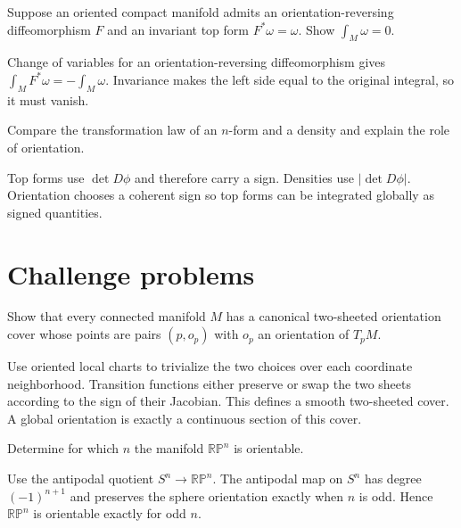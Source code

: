 \begin{problem}\label{prob:vii10-11}
Suppose an oriented compact manifold admits an orientation-reversing diffeomorphism $F$ and an invariant top form $F^*\omega=\omega$. Show $\int_M\omega=0$.
\end{problem}
\begin{solution}
Change of variables for an orientation-reversing diffeomorphism gives $\int_MF^*\omega=-\int_M\omega$. Invariance makes the left side equal to the original integral, so it must vanish.
\end{solution}

\begin{problem}\label{prob:vii10-12}
Compare the transformation law of an $n$-form and a density and explain the role of orientation.
\end{problem}
\begin{solution}
Top forms use $\det D\phi$ and therefore carry a sign. Densities use $|\det D\phi|$. Orientation chooses a coherent sign so top forms can be integrated globally as signed quantities.
\end{solution}


\section{Challenge problems}

\begin{problem}\label{prob:vii10-ch01}
Show that every connected manifold $M$ has a canonical two-sheeted orientation cover whose points are pairs $(p,o_p)$ with $o_p$ an orientation of $T_pM$.
\end{problem}
\begin{solution}
Use oriented local charts to trivialize the two choices over each coordinate neighborhood. Transition functions either preserve or swap the two sheets according to the sign of their Jacobian. This defines a smooth two-sheeted cover. A global orientation is exactly a continuous section of this cover.
\end{solution}

\begin{problem}\label{prob:vii10-ch02}
Determine for which $n$ the manifold $\mathbb{RP}^n$ is orientable.
\end{problem}
\begin{solution}
Use the antipodal quotient $S^n\to\mathbb{RP}^n$. The antipodal map on $S^n$ has degree $(-1)^{n+1}$ and preserves the sphere orientation exactly when $n$ is odd. Hence $\mathbb{RP}^n$ is orientable exactly for odd $n$.
\end{solution}

